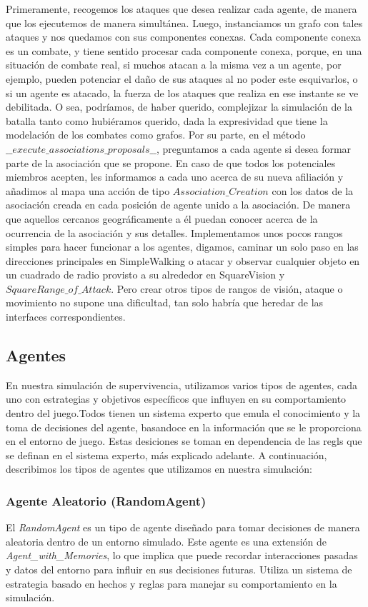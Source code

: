 \documentclass[11pt]{article}
\begin{document}
Primeramente, recogemos los ataques que desea realizar cada agente, de manera que los ejecutemos de manera simultánea. Luego, instanciamos un grafo con tales ataques y nos quedamos con sus componentes conexas. Cada componente conexa es un combate, y tiene sentido procesar cada componente conexa, porque, en una situación de combate real, si muchos atacan a la misma vez a un agente, por ejemplo, pueden potenciar el daño de sus ataques al no poder este esquivarlos, o si un agente es atacado, la fuerza de los ataques que realiza en ese instante se ve debilitada. O sea, podríamos, de haber querido, complejizar la simulación de la batalla tanto como hubiéramos querido, dada la expresividad que tiene la modelación de los combates como grafos.
Por su parte, en el método $\_\_execute\_associations\_proposals\_\_$, preguntamos a cada agente si desea formar parte de la asociación que se propone. En caso de que todos los potenciales miembros acepten, les informamos a cada uno acerca de su nueva afiliación y añadimos al mapa una acción de tipo $Association\_Creation$ con los datos de la asociación creada en cada posición de agente unido a la asociación. De manera que aquellos cercanos geográficamente a él puedan conocer acerca de la ocurrencia de la asociación y sus detalles.
Implementamos unos pocos rangos simples para hacer funcionar a los agentes, digamos, caminar un solo paso en las direcciones principales en SimpleWalking o atacar y observar cualquier objeto en un cuadrado de radio provisto a su alrededor en SquareVision y $SquareRange\_of\_Attack$. Pero crear otros tipos de rangos de visión, ataque o movimiento no supone una dificultad, tan solo habría que heredar de las interfaces correspondientes.
\subsection{Agentes}
En nuestra simulación de supervivencia, utilizamos varios tipos de agentes, cada uno con estrategias y objetivos específicos que influyen en su comportamiento dentro del juego.Todos tienen un sistema experto que emula el conocimiento y la toma de decisiones del agente,
basandoce en la información que se le proporciona en el entorno de juego. Estas desiciones se toman en dependencia de las regls que se definan en el sistema experto, más explicado adelante. A continuación, describimos los tipos de agentes que utilizamos en nuestra simulación:

\subsubsection{Agente Aleatorio (RandomAgent)}
El \textit{RandomAgent} es un tipo de agente diseñado para tomar decisiones de manera aleatoria dentro de un entorno simulado. Este agente es una extensión de \textit{Agent\_with\_Memories}, lo que implica que puede recordar interacciones pasadas y datos del entorno para influir en sus decisiones futuras. Utiliza un sistema de estrategia basado en hechos y reglas para manejar su comportamiento en la simulación.
\end{document}
